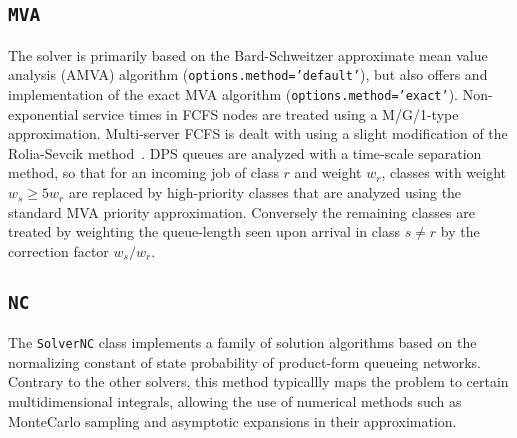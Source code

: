 \subsection{\texttt{MVA}}
The solver is primarily based on the Bard-Schweitzer approximate mean value analysis (AMVA) algorithm (\texttt{options.method='default'}), but also offers and implementation of the exact MVA algorithm (\texttt{options.method='exact'}). Non-exponential service times in FCFS nodes are treated using a M/G/1-type approximation. Multi-server FCFS is dealt with using a slight modification of the Rolia-Sevcik method~\cite{roli.sevc95}. DPS queues are analyzed with a time-scale separation method, so that for an incoming job of class $r$ and weight $w_r$, classes with weight $w_s\geq 5w_r$ are replaced by high-priority classes that are analyzed using the standard MVA priority approximation. Conversely the remaining classes are treated by weighting the queue-length seen upon arrival in class $s\neq r$ by the correction factor $w_s/w_r$.

\subsection{\texttt{NC}}
The \texttt{SolverNC} class implements a family of solution algorithms based on the normalizing constant of state probability of product-form queueing networks. Contrary to the other solvers, this method typicallly maps the problem to certain multidimensional integrals, allowing the use of numerical methods such as MonteCarlo sampling and asymptotic expansions in their approximation.

